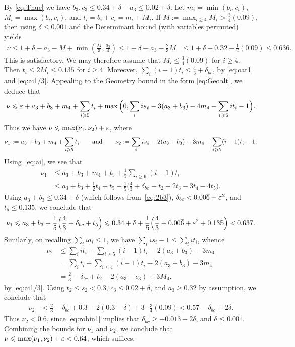 By \eqref{eq:Thue} we have $b_3,c_3\le 0.34+\delta-a_3\le 0.02+\delta$.
Let $m_i=\min(b_i,c_i)$, $M_i=\max(b_i,c_i)$, and $t_i=b_i+c_i=m_i+M_i$.
   If  $M :=\max_{i\ge4}M_i > \frac{3}{4}(0.09)$, then using $\delta\leq 0.001$ and the Determinant bound (with variables permuted) yields
\begin{align*}
\nu  \le 1 +\delta- a_3 - M + \min\left(\frac{M}{3}, \frac{a_3}{4}\right)
\le 1+\delta - a_3 - \frac{2}{3}M
&\le 1+\delta-0.32 - \frac{1}{2}(0.09) \le 0.636.
\end{align*}
This is satisfactory.
We may therefore assume that  $M_i\le \frac{3}{4}(0.09)$ for $i\ge4$. Then $t_i\le 2M_i\le 0.135$ for $i\ge4$.
Moreover,  $\sum_{i}(i-1)t_i \le \frac{4}{3}+\delta_{bc}$, by
\eqref{eq:oat1}
 and
\eqref{eq:ai1/3}.
Appealing to the Geometry bound in the form \eqref{eq:Geoalt}, we deduce that
\begin{align*}
\nu \le \eps + a_3+b_3 + m_4+\sum_{i\ge5}t_i + \max\Big(0 , \sum_i is_i -  3(a_3+b_3) - 4m_4-\sum_{i\ge5}it_i  - 1\Big).
\end{align*}
Thus we have $\nu \le \max(\nu_1,\nu_2)+\eps$, where
\begin{align*}
\nu_1 := a_3+b_3 + m_4+\sum_{i\ge5}t_i
\qquad{\rm and}\qquad
\nu_2
:= \sum_i is_i -2(a_3+b_3) - 3m_4 - \sum_{i\ge5}(i-1)t_i -1.
\end{align*}
Using~\eqref{eq:ai}, we see that
\begin{align*}
\nu_1 &\le a_3+b_3 +m_4+t_5+\frac{1}{5}\sum_{i\ge6}(i-1)t_i\\
 & \le a_3 + b_3 + \frac{1}{2}t_4+t_5+\frac{1}{5}\Big(\frac{4}{3}+\delta_{bc}-t_2-2t_3- 3t_4-4t_5\Big).
\end{align*}
Using $a_3+b_3\le 0.34+\delta$ (which follows from~\eqref{eq:2b3}), $\delta_{bc}<0.00\overline{6}+\eps^2$, and $t_5\le 0.135$, we conclude that
$$
\nu_1  \le a_3+b_3 + \frac{1}{5}\Big(\frac{4}{3}+\delta_{bc}+t_5\Big)
 \le 0.34+ \delta + \frac{1}{5}\Big(\frac{4}{3}+0.00\overline{6}+\eps^2+0.135\Big) < 0.637.
$$
Similarly, on recalling $\sum_i i a_i \le 1$,  we have $\sum_i is_i -1 \le \sum_i it_i$, whence
\begin{align*}
\nu_2
&\le \sum_i it_i - \sum_{i\ge5}(i-1)t_i -2(a_3+b_3) - 3m_4\\
&= \sum_{i} t_i + \sum_{i\le4}(i-1)t_i -2(a_3+b_3) - 3m_4\\
& = \frac{2}{3} -\delta_{bc}+ t_2 - 2(a_3-c_3) +3M_4,
\end{align*}
by \eqref{eq:ai1/3}. Using
$t_2\le s_2< 0.3$, $c_3\le 0.02+\delta$, and $a_3\ge 0.32$ by assumption, we conclude that
\begin{align*}
\nu_2
& < \frac{2}{3} -\delta_{bc} + 0.3 - 2(0.3-\delta) + 3\cdot\frac{3}{4}(0.09) <
0.57-\delta_{bc}+2\delta.
\end{align*}
Thus $\nu_2<0.6$, since
 \eqref{eq:robin1} implies that $\delta_{bc}\geq -0.01\bar3-2\delta$, and $\delta\leq 0.001$. Combining the bounds for $\nu_1$ and $\nu_2$, we conclude that $\nu \le \max(\nu_1,\nu_2)+\eps<0.64$, which suffices.


